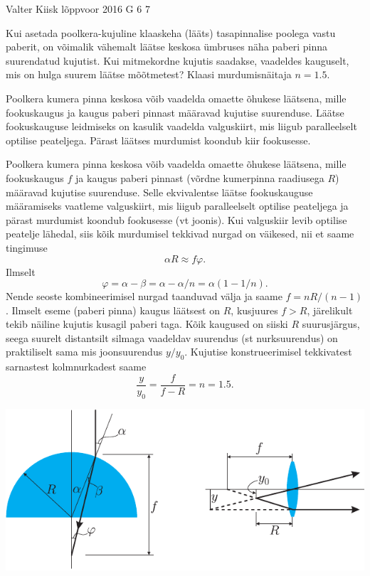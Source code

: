 {Valter Kiisk} %
{lõppvoor} %
{2016} %
{G 6} %
{7} %
{
\ifStatement
Kui asetada poolkera-kujuline klaaskeha (lääts) tasapinnalise poolega vastu paberit, on võimalik vähemalt läätse keskosa ümbruses näha paberi pinna suurendatud kujutist. Kui mitmekordne kujutis saadakse, vaadeldes kauguselt, mis on hulga suurem läätse mõõtmetest? Klaasi murdumisnäitaja $n=\num{1.5}$.
\fi


\ifHint
Poolkera kumera pinna keskosa võib vaadelda omaette õhukese läätsena, mille fookuskaugus ja kaugus paberi pinnast määravad kujutise suurenduse. Läätse fookuskauguse leidmiseks on kasulik vaadelda valguskiirt, mis liigub paralleelselt optilise peateljega. Pärast läätses murdumist koondub kiir fookusesse.
\fi


\ifSolution
Poolkera kumera pinna keskosa võib vaadelda omaette õhukese läätsena, mille fookuskaugus $f$ ja kaugus paberi pinnast (võrdne kumerpinna raadiusega $R$) määravad kujutise suurenduse. Selle ekvivalentse läätse fookuskauguse määramiseks vaatleme valguskiirt, mis liigub paralleelselt optilise peateljega ja pärast murdumist koondub fookusesse (vt joonis). Kui valguskiir levib optilise peatelje lähedal, siis kõik murdumisel tekkivad nurgad on väikesed, nii et saame tingimuse
\[
\alpha R\approx f\varphi.
\]
Ilmselt
\[
\varphi = \alpha - \beta=\alpha-\alpha/n=\alpha(1-1/n).
\]
Nende seoste kombineerimisel nurgad taanduvad välja ja saame $f=nR/(n-1)$. Ilmselt eseme (paberi pinna) kaugus läätsest on $R$, kusjuures $f > R$, järelikult tekib näiline kujutis kusagil paberi taga. Kõik kaugused on siiski $R$ suurusjärgus, seega suurelt distantsilt silmaga vaadeldav suurendus (st nurksuurendus) on praktiliselt sama mis joonsuurendus $y/y_0$. Kujutise konstrueerimisel tekkivatest sarnastest kolmnurkadest saame
\[
\frac{y}{y_0}=\frac{f}{f-R}=n=\num{1.5}.
\]

\begin{center}
	\includegraphics[scale=1.2]{2016-v3g-06-luup-lah}
\end{center}
\fi


}
